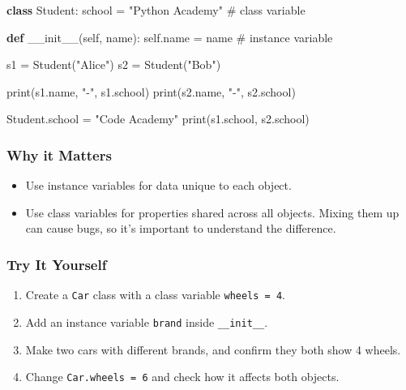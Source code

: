 \documentclass[
  letterpaper,
  DIV=11,
  numbers=noendperiod]{scrreprt}
\newenvironment{Shaded}{\begin{snugshade}}{\end{snugshade}}
\newcommand{\BuiltInTok}[1]{\textcolor[rgb]{0.00,0.23,0.31}{#1}}
\newcommand{\CommentTok}[1]{\textcolor[rgb]{0.37,0.37,0.37}{#1}}
\newcommand{\FunctionTok}[1]{\textcolor[rgb]{0.28,0.35,0.67}{#1}}
\newcommand{\KeywordTok}[1]{\textcolor[rgb]{0.00,0.23,0.31}{\textbf{#1}}}
\newcommand{\NormalTok}[1]{\textcolor[rgb]{0.00,0.23,0.31}{#1}}
\newcommand{\OperatorTok}[1]{\textcolor[rgb]{0.37,0.37,0.37}{#1}}
\newcommand{\StringTok}[1]{\textcolor[rgb]{0.13,0.47,0.30}{#1}}
\newcommand{\VariableTok}[1]{\textcolor[rgb]{0.07,0.07,0.07}{#1}}
\providecommand{\tightlist}{%
  \setlength{\itemsep}{0pt}\setlength{\parskip}{0pt}}
\begin{document}
\begin{Shaded}
\begin{Highlighting}[]
\KeywordTok{class}\NormalTok{ Student:}
\NormalTok{    school }\OperatorTok{=} \StringTok{"Python Academy"}   \CommentTok{\# class variable}
    
    \KeywordTok{def} \FunctionTok{\_\_init\_\_}\NormalTok{(}\VariableTok{self}\NormalTok{, name):}
        \VariableTok{self}\NormalTok{.name }\OperatorTok{=}\NormalTok{ name        }\CommentTok{\# instance variable}

\NormalTok{s1 }\OperatorTok{=}\NormalTok{ Student(}\StringTok{"Alice"}\NormalTok{)}
\NormalTok{s2 }\OperatorTok{=}\NormalTok{ Student(}\StringTok{"Bob"}\NormalTok{)}

\BuiltInTok{print}\NormalTok{(s1.name, }\StringTok{"{-}"}\NormalTok{, s1.school)}
\BuiltInTok{print}\NormalTok{(s2.name, }\StringTok{"{-}"}\NormalTok{, s2.school)}

\NormalTok{Student.school }\OperatorTok{=} \StringTok{"Code Academy"}
\BuiltInTok{print}\NormalTok{(s1.school, s2.school)}
\end{Highlighting}
\end{Shaded}

\subsubsection{Why it Matters}\label{why-it-matters-63}

\begin{itemize}
\tightlist
\item
  Use instance variables for data unique to each object.
\item
  Use class variables for properties shared across all objects. Mixing
  them up can cause bugs, so it's important to understand the
  difference.
\end{itemize}

\subsubsection{Try It Yourself}\label{try-it-yourself-63}

\begin{enumerate}
\def\labelenumi{\arabic{enumi}.}
\tightlist
\item
  Create a \texttt{Car} class with a class variable
  \texttt{wheels\ =\ 4}.
\item
  Add an instance variable \texttt{brand} inside \texttt{\_\_init\_\_}.
\item
  Make two cars with different brands, and confirm they both show 4
  wheels.
\item
  Change \texttt{Car.wheels\ =\ 6} and check how it affects both
  objects.
\end{enumerate}
\end{document}
